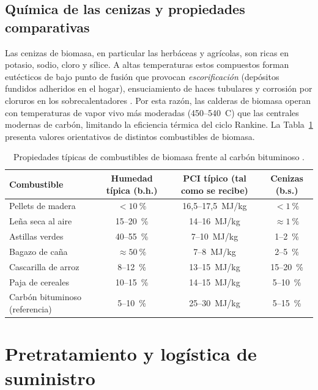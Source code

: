 \subsection{Química de las cenizas y propiedades comparativas}
Las cenizas de biomasa, en particular las herbáceas y agrícolas, son ricas en potasio, sodio, cloro y sílice. A altas temperaturas estos compuestos forman eutécticos de bajo punto de fusión que provocan \textit{escorificación} (depósitos fundidos adheridos en el hogar), ensuciamiento de haces tubulares y corrosión por cloruros en los sobrecalentadores \cite{vanloo2007handbook}. Por esta razón, las calderas de biomasa operan con temperaturas de vapor vivo más moderadas (450--540~\textdegree C) que las centrales modernas de carbón, limitando la eficiencia térmica del ciclo Rankine. La Tabla~\ref{tab:propiedades_combustibles} presenta valores orientativos de distintos combustibles de biomasa.

\begin{table}[htbp]
\centering
\caption{Propiedades típicas de combustibles de biomasa frente al carbón bituminoso \cite{idae2007biomasa, vanloo2007handbook, mckendry2002energy}.}
\label{tab:propiedades_combustibles}
\begin{tabular}{@{}lccc@{}}
\toprule
\textbf{Combustible} & \textbf{Humedad típica (b.h.)} & \textbf{PCI típico (tal como se recibe)} & \textbf{Cenizas (b.s.)} \\
\midrule
Pellets de madera & $< 10~\%$ & 16,5--17,5~MJ/kg & $< 1~\%$ \\
Leña seca al aire & 15--20~\% & 14--16~MJ/kg & $\approx 1~\%$ \\
Astillas verdes & 40--55~\% & 7--10~MJ/kg & 1--2~\% \\
Bagazo de caña & $\approx 50~\%$ & 7--8~MJ/kg & 2--5~\% \\
Cascarilla de arroz & 8--12~\% & 13--15~MJ/kg & 15--20~\% \\
Paja de cereales & 10--15~\% & 14--15~MJ/kg & 5--10~\% \\
Carbón bituminoso (referencia) & 5--10~\% & 25--30~MJ/kg & 5--15~\% \\
\bottomrule
\end{tabular}
\end{table}

\section{Pretratamiento y logística de suministro}
\label{sec:pretratamiento}

